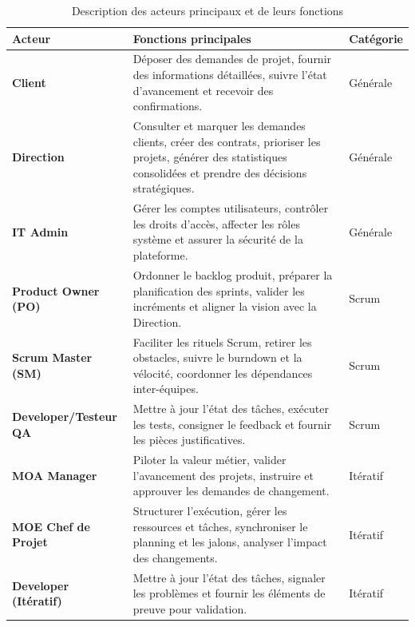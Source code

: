 \begin{table}[H]
    \centering
    \footnotesize
    \begin{tabular}{|p{2.5cm}|p{6.5cm}|p{2cm}|}
        \hline
        \textbf{Acteur} & \textbf{Fonctions principales} & \textbf{Catégorie} \\
        \hline
        \textbf{Client} & Déposer des demandes de projet, fournir des informations détaillées, suivre l'état d'avancement et recevoir des confirmations. & Générale \\
        \hline
        \textbf{Direction} & Consulter et marquer les demandes clients, créer des contrats, prioriser les projets, générer des statistiques consolidées et prendre des décisions stratégiques. & Générale \\
        \hline
        \textbf{IT Admin} & Gérer les comptes utilisateurs, contrôler les droits d'accès, affecter les rôles système et assurer la sécurité de la plateforme. & Générale \\
        \hline
        \textbf{Product Owner (PO)} & Ordonner le backlog produit, préparer la planification des sprints, valider les incréments et aligner la vision avec la Direction. & Scrum \\
        \hline
        \textbf{Scrum Master (SM)} & Faciliter les rituels Scrum, retirer les obstacles, suivre le burndown et la vélocité, coordonner les dépendances inter-équipes. & Scrum \\
        \hline
        \textbf{Developer/Testeur QA} & Mettre à jour l'état des tâches, exécuter les tests, consigner le feedback et fournir les pièces justificatives. & Scrum \\
        \hline
        \textbf{MOA Manager} & Piloter la valeur métier, valider l'avancement des projets, instruire et approuver les demandes de changement. & Itératif \\
        \hline
        \textbf{MOE Chef de Projet} & Structurer l'exécution, gérer les ressources et tâches, synchroniser le planning et les jalons, analyser l'impact des changements. & Itératif \\
        \hline
        \textbf{Developer (Itératif)} & Mettre à jour l'état des tâches, signaler les problèmes et fournir les éléments de preuve pour validation. & Itératif \\
        \hline
    \end{tabular}
    \caption{Description des acteurs principaux et de leurs fonctions}
    \label{tab:acteurs_principaux}
\end{table}


